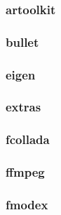 \documentclass[a4paper]{article}
\begin{document}
\hypertarget{RefHeading24211167907073}{}\clearpage\subsubsection[artoolkit]{artoolkit}
\hypertarget{RefHeading24231167907073}{}\subsubsection{}
\clearpage\subsubsection[bullet]{bullet}
\hypertarget{RefHeading24251167907073}{}\subsubsection{}
\clearpage\subsubsection[eigen]{eigen}
\hypertarget{RefHeading24271167907073}{}\subsubsection{}
\clearpage\subsubsection[extras]{extras}
\hypertarget{RefHeading24291167907073}{}\subsubsection{}
\clearpage\subsubsection[fcollada]{fcollada}
\hypertarget{RefHeading24311167907073}{}\subsubsection{}
\clearpage\subsubsection[ffmpeg]{ffmpeg}
\hypertarget{RefHeading24331167907073}{}\subsubsection{}
\clearpage\subsubsection[fmodex]{fmodex}
\end{document}
